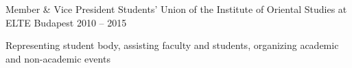
\begin{cventries}
    
  \cventry
    {Member \& Vice President} %
    {Students’ Union of the Institute of Oriental Studies at ELTE} %
    {Budapest} %
    {2010 -- 2015} %
    {
      \begin{cvitems} %
        \item {Representing student body, assisting faculty and students, organizing academic and non-academic events}
      \end{cvitems}
    }


\end{cventries}
